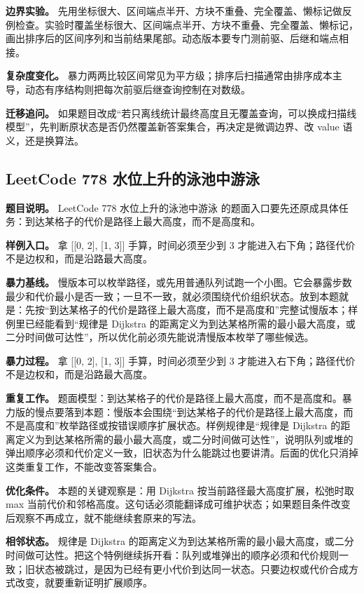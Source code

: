 \textbf{边界实验。} 先用坐标很大、区间端点半开、方块不重叠、完全覆盖、懒标记做反例检查。实验时覆盖坐标很大、区间端点半开、方块不重叠、完全覆盖、懒标记，画出排序后的区间序列和当前结果尾部。动态版本要专门测前驱、后继和端点相接。

\textbf{复杂度变化。} 暴力两两比较区间常见为平方级；排序后扫描通常由排序成本主导，动态有序结构则把每次前驱后继查询控制在对数级。

\textbf{迁移追问。} 如果题目改成“若只离线统计最终高度且无覆盖查询，可以换成扫描线模型”，先判断原状态是否仍然覆盖新答案集合，再决定是微调边界、改 value 语义，还是换算法。

\subsection{LeetCode 778 水位上升的泳池中游泳}

\textbf{题目说明。} LeetCode 778 水位上升的泳池中游泳 的题面入口要先还原成具体任务：到达某格子的代价是路径上最大高度，而不是高度和。

\textbf{样例入口。} 拿 [[0, 2], [1, 3]] 手算，时间必须至少到 3 才能进入右下角；路径代价不是边权和，而是沿路最大高度。

\textbf{暴力基线。} 慢版本可以枚举路径，或先用普通队列试跑一个小图。它会暴露步数最少和代价最小是否一致；一旦不一致，就必须围绕代价组织状态。放到本题就是：先按“到达某格子的代价是路径上最大高度，而不是高度和”完整试慢版本；样例里已经能看到“规律是 Dijkstra 的距离定义为到达某格所需的最小最大高度，或二分时间做可达性”，所以优化前必须先能说清慢版本枚举了哪些候选。

\textbf{暴力过程。} 拿 [[0, 2], [1, 3]] 手算，时间必须至少到 3 才能进入右下角；路径代价不是边权和，而是沿路最大高度。

\textbf{重复工作。} 题面模型：到达某格子的代价是路径上最大高度，而不是高度和。暴力版的慢点要落到本题：慢版本会围绕“到达某格子的代价是路径上最大高度，而不是高度和”枚举路径或按错误顺序扩展状态。样例规律是“规律是 Dijkstra 的距离定义为到达某格所需的最小最大高度，或二分时间做可达性”，说明队列或堆的弹出顺序必须和代价定义一致，旧状态为什么能跳过也要讲清。后面的优化只消掉这类重复工作，不能改变答案集合。

\textbf{优化条件。} 本题的关键观察是：用 Dijkstra 按当前路径最大高度扩展，松弛时取 max 当前代价和邻格高度。这句话必须能翻译成可维护状态；如果题目条件改变后观察不再成立，就不能继续套原来的写法。

\textbf{相邻状态。} 规律是 Dijkstra 的距离定义为到达某格所需的最小最大高度，或二分时间做可达性。把这个特例继续拆开看：队列或堆弹出的顺序必须和代价规则一致；旧状态被跳过，是因为已经有更小代价到达同一状态。只要边权或代价合成方式改变，就要重新证明扩展顺序。

